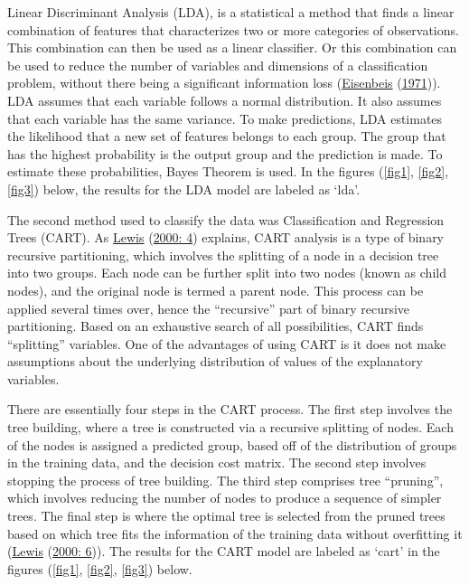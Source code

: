 \documentclass[11pt,preprint, authoryear]{elsarticle}
\numberwithin{equation}{section}
\numberwithin{figure}{section}
\numberwithin{table}{section}
\begin{document}
Linear Discriminant Analysis (LDA), is a statistical a method that finds
a linear combination of features that characterizes two or more
categories of observations. This combination can then be used as a
linear classifier. Or this combination can be used to reduce the number
of variables and dimensions of a classification problem, without there
being a significant information loss
(\protect\hyperlink{ref-lda}{Eisenbeis}
(\protect\hyperlink{ref-lda}{1971})). LDA assumes that each variable
follows a normal distribution. It also assumes that each variable has
the same variance. To make predictions, LDA estimates the likelihood
that a new set of features belongs to each group. The group that has the
highest probability is the output group and the prediction is made. To
estimate these probabilities, Bayes Theorem is used. In the figures
(\ref{fig1}, \ref{fig2}, \ref{fig3}) below, the results for the LDA
model are labeled as `lda'.

The second method used to classify the data was Classification and
Regression Trees (CART). As \protect\hyperlink{ref-cart}{Lewis}
(\protect\hyperlink{ref-cart}{2000: 4}) explains, CART analysis is a
type of binary recursive partitioning, which involves the splitting of a
node in a decision tree into two groups. Each node can be further split
into two nodes (known as child nodes), and the original node is termed a
parent node. This process can be applied several times over, hence the
``recursive'' part of binary recursive partitioning. Based on an
exhaustive search of all possibilities, CART finds ``splitting''
variables. One of the advantages of using CART is it does not make
assumptions about the underlying distribution of values of the
explanatory variables.

There are essentially four steps in the CART process. The first step
involves the tree building, where a tree is constructed via a recursive
splitting of nodes. Each of the nodes is assigned a predicted group,
based off of the distribution of groups in the training data, and the
decision cost matrix. The second step involves stopping the process of
tree building. The third step comprises tree ``pruning'', which involves
reducing the number of nodes to produce a sequence of simpler trees. The
final step is where the optimal tree is selected from the pruned trees
based on which tree fits the information of the training data without
overfitting it (\protect\hyperlink{ref-cart}{Lewis}
(\protect\hyperlink{ref-cart}{2000: 6})). The results for the CART model
are labeled as `cart' in the figures (\ref{fig1}, \ref{fig2},
\ref{fig3}) below.
\end{document}
